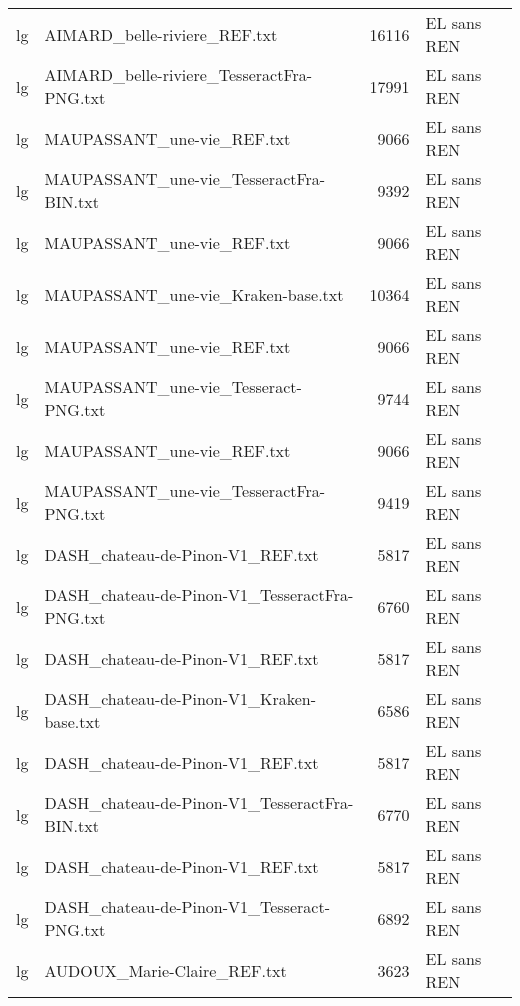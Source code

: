\begin{tabular}{llrl}
    lg &                       AIMARD\_belle-riviere\_REF.txt &                 16116 & EL sans REN \\
    lg &          AIMARD\_belle-riviere\_TesseractFra-PNG.txt &                 17991 & EL sans REN \\
    lg &                         MAUPASSANT\_une-vie\_REF.txt &                  9066 & EL sans REN \\
    lg &            MAUPASSANT\_une-vie\_TesseractFra-BIN.txt &                  9392 & EL sans REN \\
    lg &                         MAUPASSANT\_une-vie\_REF.txt &                  9066 & EL sans REN \\
    lg &                 MAUPASSANT\_une-vie\_Kraken-base.txt &                 10364 & EL sans REN \\
    lg &                         MAUPASSANT\_une-vie\_REF.txt &                  9066 & EL sans REN \\
    lg &               MAUPASSANT\_une-vie\_Tesseract-PNG.txt &                  9744 & EL sans REN \\
    lg &                         MAUPASSANT\_une-vie\_REF.txt &                  9066 & EL sans REN \\
    lg &            MAUPASSANT\_une-vie\_TesseractFra-PNG.txt &                  9419 & EL sans REN \\
    lg &                   DASH\_chateau-de-Pinon-V1\_REF.txt &                  5817 & EL sans REN \\
    lg &      DASH\_chateau-de-Pinon-V1\_TesseractFra-PNG.txt &                  6760 & EL sans REN \\
    lg &                   DASH\_chateau-de-Pinon-V1\_REF.txt &                  5817 & EL sans REN \\
    lg &           DASH\_chateau-de-Pinon-V1\_Kraken-base.txt &                  6586 & EL sans REN \\
    lg &                   DASH\_chateau-de-Pinon-V1\_REF.txt &                  5817 & EL sans REN \\
    lg &      DASH\_chateau-de-Pinon-V1\_TesseractFra-BIN.txt &                  6770 & EL sans REN \\
    lg &                   DASH\_chateau-de-Pinon-V1\_REF.txt &                  5817 & EL sans REN \\
    lg &         DASH\_chateau-de-Pinon-V1\_Tesseract-PNG.txt &                  6892 & EL sans REN \\
    lg &                        AUDOUX\_Marie-Claire\_REF.txt &                  3623 & EL sans REN \\

\end{tabular}
